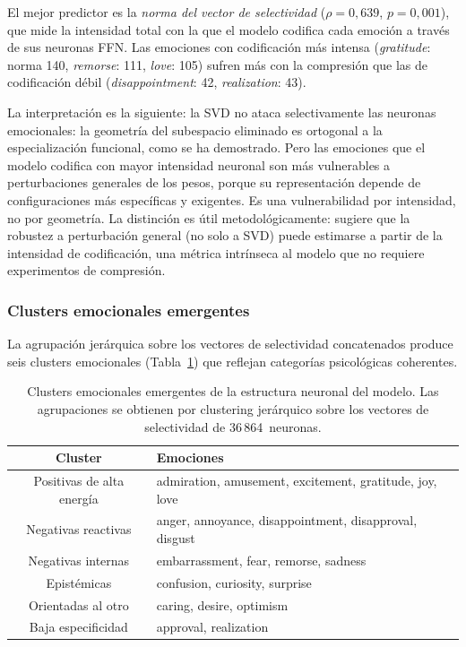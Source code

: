 El mejor predictor es la \emph{norma del vector de selectividad}
($\rho = 0{,}639$, $p = 0{,}001$), que mide la intensidad total con la
que el modelo codifica cada emoción a través de sus neuronas FFN. Las
emociones con codificación más intensa (\emph{gratitude}: norma 140,
\emph{remorse}: 111, \emph{love}: 105) sufren más con la compresión
que las de codificación débil (\emph{disappointment}: 42,
\emph{realization}: 43).

La interpretación es la siguiente: la SVD no ataca selectivamente las
neuronas emocionales: la geometría del subespacio eliminado es
ortogonal a la especialización funcional, como se ha demostrado. Pero
las emociones que el modelo codifica con mayor intensidad neuronal
son más vulnerables a perturbaciones generales de los pesos,
porque su representación depende de configuraciones más específicas y
exigentes. Es una vulnerabilidad por intensidad, no por
geometría. La distinción es útil metodológicamente: sugiere
que la robustez a perturbación general (no solo a SVD) puede
estimarse a partir de la intensidad de codificación, una métrica
intrínseca al modelo que no requiere experimentos de compresión.

\subsubsection{Clusters emocionales emergentes}

La agrupación jerárquica sobre los vectores de selectividad
concatenados produce seis clusters emocionales
(Tabla~\ref{tab:neuron-clusters}) que reflejan categorías psicológicas
coherentes.

\begin{table}[ht]
\centering
\caption{Clusters emocionales emergentes de la estructura neuronal del
modelo. Las agrupaciones se obtienen por clustering jerárquico sobre
los vectores de selectividad de 36\,864~neuronas.}
\label{tab:neuron-clusters}
\begin{tabular}{cl}
\toprule
\textbf{Cluster} & \textbf{Emociones} \\
\midrule
Positivas de alta energía & admiration, amusement, excitement, gratitude, joy, love \\
Negativas reactivas       & anger, annoyance, disappointment, disapproval, disgust \\
Negativas internas        & embarrassment, fear, remorse, sadness \\
Epistémicas               & confusion, curiosity, surprise \\
Orientadas al otro        & caring, desire, optimism \\
Baja especificidad        & approval, realization \\
\bottomrule
\end{tabular}
\end{table}

